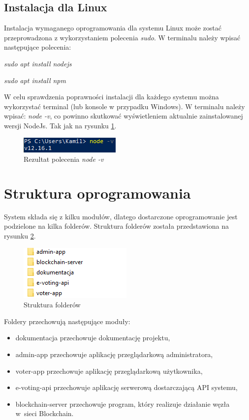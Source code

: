 \documentclass[a4paper,12pt]{book}
\begin{document}
\subsection{Instalacja dla Linux}
Instalacja wymaganego oprogramowania dla systemu Linux może zostać przeprowadzona z wykorzystaniem polecenia \textit{sudo}. W terminalu należy wpisać następujące polecenia: 

\textit{sudo apt install nodejs}

\textit{sudo apt install npm}

W celu sprawdzenia poprawności instalacji dla każdego systemu można wykorzystać terminal (lub konsole w przypadku Windows). W terminalu należy wpisać: \textit{node -v}, co powinno skutkować wyświetleniem aktualnie zainstalowanej wersji NodeJs. Tak jak na rysunku \ref{nodeversion}.

\begin{figure}[h]
	\centering
	\includegraphics{images/node_version.png}
	\caption{Rezultat polecenia \textit{node -v}}\label{nodeversion}
\end {figure}

\section{Struktura oprogramowania}

System składa się z kilku modułów, dlatego dostarczone oprogramowanie jest podzielone na kilka folderów. Struktura folderów została przedstawiona na rysunku \ref{foldery}.

\begin{figure}[h]
	\centering
	\includegraphics{images/foldery.png}
	\caption{Struktura folderów}\label{foldery}
\end {figure}

Foldery przechowują następujące moduły:
\begin{itemize}
  \item dokumentacja przechowuje dokumentację projektu,
	\item admin-app przechowuje aplikację przeglądarkową administratora,
	\item voter-app przechowuje aplikację przeglądarkową użytkownika,
	\item e-voting-api przechowuje aplikację serwerową dostarczającą API systemu,
	\item blockchain-server przechowuje program, który realizuje działanie węzła w~sieci Blockchain.
\end{itemize}
\end{document}
